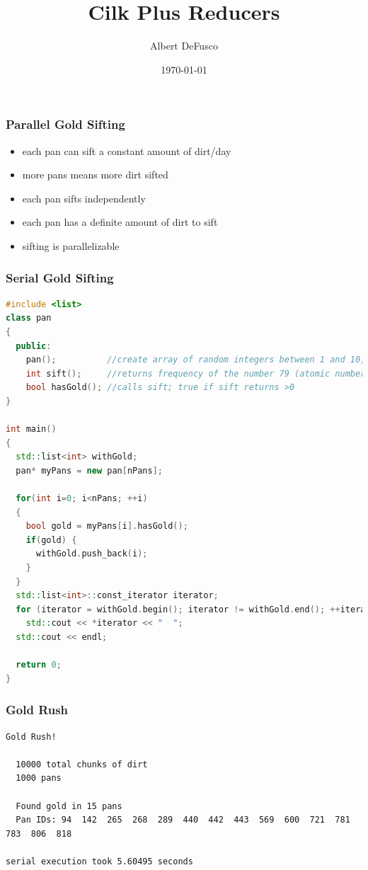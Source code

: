 \documentclass[fleqn,xcolor=table,10pt,final]{beamer}
\begin{document}
\title{Cilk Plus Reducers}
\author{Albert DeFusco}
\date{\today}
\frame{\titlepage}


\begin{frame}
  \frametitle{Parallel Gold Sifting}
  \begin{itemize}
    \item each pan can sift a constant amount of dirt/day
    \item more pans means more dirt sifted
  \end{itemize}
  \vskip 0.2cm
  \begin{itemize}
    \item each pan sifts independently
    \item each pan has a definite amount of dirt to sift
  \end{itemize}
  \vskip 0.2cm
  \begin{itemize}
    \item sifting is parallelizable
  \end{itemize}
\end{frame}

\begin{frame}[fragile]
  \frametitle{Serial Gold Sifting}
  \begin{lstlisting}[language=C++,basicstyle=\scriptsize]
#include <list>
class pan
{
  public:
    pan();          //create array of random integers between 1 and 10,000
    int sift();     //returns frequency of the number 79 (atomic number of gold)
    bool hasGold(); //calls sift; true if sift returns >0
}

int main()
{
  std::list<int> withGold;
  pan* myPans = new pan[nPans];

  for(int i=0; i<nPans; ++i)
  {
    bool gold = myPans[i].hasGold();
    if(gold) {
      withGold.push_back(i);
    }
  }
  std::list<int>::const_iterator iterator;
  for (iterator = withGold.begin(); iterator != withGold.end(); ++iterator)
    std::cout << *iterator << "  ";
  std::cout << endl;

  return 0;
}
  \end{lstlisting}
\end{frame}

\begin{frame}[fragile]
  \frametitle{Gold Rush}
  {\scriptsize
  \begin{verbatim}
Gold Rush!

  10000 total chunks of dirt
  1000 pans

  Found gold in 15 pans
  Pan IDs: 94  142  265  268  289  440  442  443  569  600  721  781  783  806  818

serial execution took 5.60495 seconds
  \end{verbatim}
}
\end{frame}
\end{document}
